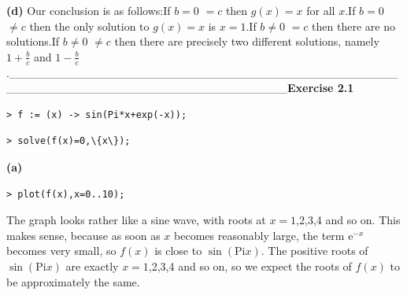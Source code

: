 \documentclass{article}
\begin{document}
\textbf{(d)} Our conclusion is as follows:If 
$ b =0 $
$ =c  $ then 
$ g (x)=x  $ for all 
$ x  $.If 
$ b =0 $
$ \neq c  $ then the only solution to 
$ g (x)=x  $ is 
$ x =1 $.If 
$ b \neq 0 $
$ =c  $ then there are no solutions.If 
$ b \neq 0 $
$ \neq c  $ then there are precisely two different solutions, namely 
$ 1+\frac{b}{c} $ and 
$ 1-\frac{b}{c} $.\_\_\_\_\_\_\_\_\_\_\_\_\_\_\_\_\_\_\_\_\_\_\_\_\_\_\_\_\_\_\_\_\_\_\_\_\_\_\_\_\_\_\_\_\_\_\_\_\_\_\_\_\_\_\_\_\_\_\_\_\_\_\_\_\_\_\_\_\_\_\_\_\_\_\_\_\_\_\_\_\_\textbf{Exercise 2.1}\begin{lstlisting}
> f := (x) -> sin(Pi*x+exp(-x));
\end{lstlisting}
\begin{lstlisting}
> solve(f(x)=0,\{x\});
\end{lstlisting}
\begin{Maple Normal}
\textbf{(a)}
\end{Maple Normal}
\begin{lstlisting}
> plot(f(x),x=0..10);
\end{lstlisting}
The graph looks rather like a sine wave, with roots at 
$ x =1 $,2,3,4 and so on.  This makes sense, because as soon as 
$ x  $ becomes reasonably large, the term 
$ {\mathrm e}^{-x} $ becomes very small, so 
$ f (x) $ is close to 
$ \sin (\mathrm{Pi} x) $.  The positive roots of 
$ \sin (\mathrm{Pi} x) $ are exactly 
$ x =1 $,2,3,4 and so on, so we expect the roots of 
$ f (x) $ to be approximately the same.\

\
\end{document}
